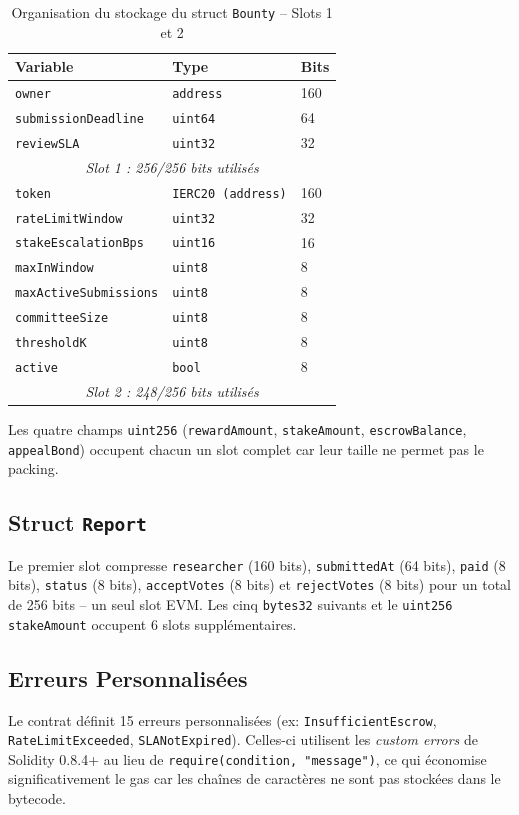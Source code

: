 \documentclass[12pt, a4paper]{report}
\begin{document}
\begin{table}[H]
\centering
\begin{tabular}{@{}lll@{}}
\toprule
\textbf{Variable} & \textbf{Type} & \textbf{Bits} \\ \midrule
\texttt{owner} & \texttt{address} & 160 \\
\texttt{submissionDeadline} & \texttt{uint64} & 64 \\
\texttt{reviewSLA} & \texttt{uint32} & 32 \\ \midrule
\multicolumn{3}{c}{\textit{Slot 1 : 256/256 bits utilis\'{e}s}} \\ \midrule
\texttt{token} & \texttt{IERC20 (address)} & 160 \\
\texttt{rateLimitWindow} & \texttt{uint32} & 32 \\
\texttt{stakeEscalationBps} & \texttt{uint16} & 16 \\
\texttt{maxInWindow} & \texttt{uint8} & 8 \\
\texttt{maxActiveSubmissions} & \texttt{uint8} & 8 \\
\texttt{committeeSize} & \texttt{uint8} & 8 \\
\texttt{thresholdK} & \texttt{uint8} & 8 \\
\texttt{active} & \texttt{bool} & 8 \\ \midrule
\multicolumn{3}{c}{\textit{Slot 2 : 248/256 bits utilis\'{e}s}} \\ \bottomrule
\end{tabular}
\caption{Organisation du stockage du struct \texttt{Bounty} -- Slots 1 et 2}
\end{table}

Les quatre champs \texttt{uint256} (\texttt{rewardAmount}, \texttt{stakeAmount}, \texttt{escrowBalance}, \texttt{appealBond}) occupent chacun un slot complet car leur taille ne permet pas le packing.

\subsection{Struct \texttt{Report}}
Le premier slot compresse \texttt{researcher} (160 bits), \texttt{submittedAt} (64 bits), \texttt{paid} (8 bits), \texttt{status} (8 bits), \texttt{acceptVotes} (8 bits) et \texttt{rejectVotes} (8 bits) pour un total de 256 bits -- un seul slot EVM. Les cinq \texttt{bytes32} suivants et le \texttt{uint256 stakeAmount} occupent 6 slots suppl\'{e}mentaires.

\subsection{Erreurs Personnalis\'{e}es}
Le contrat d\'{e}finit 15 erreurs personnalis\'{e}es (ex: \texttt{InsufficientEscrow}, \texttt{RateLimitExceeded}, \texttt{SLANotExpired}). Celles-ci utilisent les \textit{custom errors} de Solidity 0.8.4+ au lieu de \texttt{require(condition, "message")}, ce qui \'{e}conomise significativement le gas car les cha\^{i}nes de caract\`{e}res ne sont pas stock\'{e}es dans le bytecode.
\end{document}
